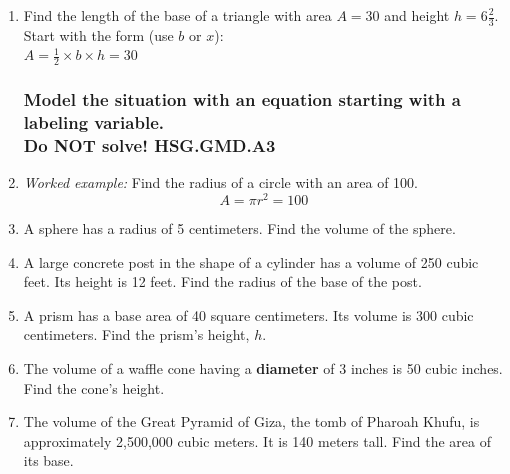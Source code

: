 \begin{enumerate}
\item Find the length of the base of a triangle with area $A=30$ and height $h=6 \frac{2}{3}$. Start with the form (use $b$ or $x$): \\[0.5cm]
$A = \frac{1}{2} \times b \times h = 30$
  \begin{flushright}
  \end{flushright}

\newpage
\subsubsection*{Model the situation with an equation starting with a labeling variable. \\ Do NOT solve! \hfill HSG.GMD.A3}

\item \emph{Worked example:} Find the radius of a circle with an area of 100.
\[A=\pi r^2=100\]

\item A sphere has a radius of 5 centimeters. Find the volume of the sphere. \vspace{2cm}

\item A large concrete post in the shape of a cylinder has a volume of 250 cubic feet. Its height is 12 feet. Find the radius of the base of the post. \vspace{2cm}

\item A prism has a base area of 40 square centimeters. Its volume is 300 cubic centimeters. Find the prism's height, $h$. \vspace{2cm}

\item The volume of a waffle cone having a \textbf{diameter} of 3 inches is 50 cubic inches. Find the cone's height. \vspace{2cm}

\item The volume of the Great Pyramid of Giza, the tomb of Pharoah Khufu, is approximately 2,500,000 cubic meters. It is 140 meters tall. Find the area of its base.  \vspace{2cm}


\end{enumerate}
